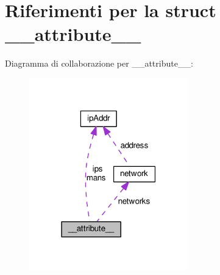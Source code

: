 \hypertarget{struct____attribute____}{}\section{Riferimenti per la struct \+\_\+\+\_\+attribute\+\_\+\+\_\+}
\label{struct____attribute____}


Diagramma di collaborazione per \+\_\+\+\_\+attribute\+\_\+\+\_\+\+:\nopagebreak
\begin{figure}[H]
\begin{center}
\leavevmode
\includegraphics[width=195pt]{struct____attribute______coll__graph}
\end{center}
\end{figure}
